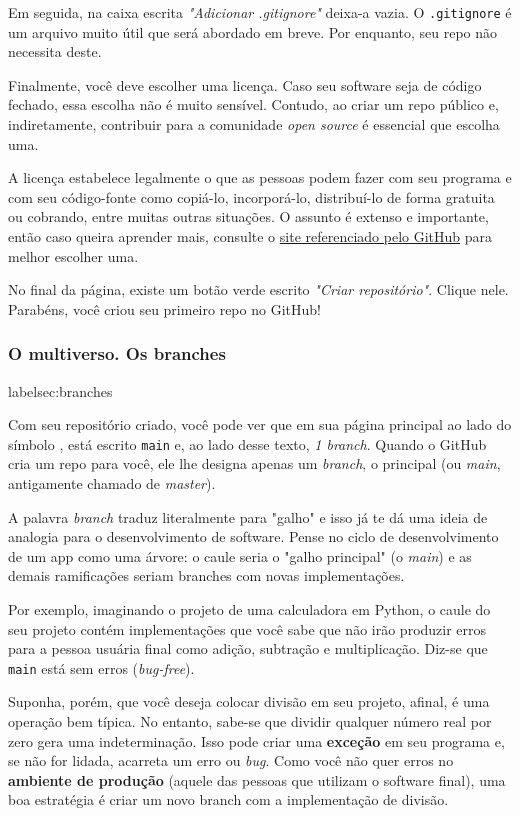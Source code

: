 \documentclass{article}
\begin{document}
	Em seguida, na caixa escrita \textit{"Adicionar .gitignore"} deixa-a vazia. O \texttt{.gitignore} é um arquivo muito útil 
	que será abordado em breve. Por enquanto, seu repo não necessita deste. 
	
	Finalmente, você deve escolher uma licença. Caso seu software seja de código fechado, essa escolha não é muito sensível.
	Contudo, ao criar um repo público e, indiretamente, contribuir para a comunidade \textit{open source} é essencial que escolha 
	uma.

	A licença estabelece legalmente o que as pessoas podem fazer com seu programa e com seu código-fonte como copiá-lo, incorporá-lo,
	distribuí-lo de forma gratuita ou cobrando, entre muitas outras situações. O assunto é extenso e importante, então caso queira 
	aprender mais, consulte o \href{https://choosealicense.com/}{site referenciado pelo GitHub} para melhor escolher uma.

	No final da página, existe um botão verde escrito \textit{"Criar repositório"}. Clique nele. Parabéns, você criou seu primeiro 
	repo no GitHub!

	\subsubsection{O multiverso. Os branches}
	label{sec:branches}

	Com seu repositório criado, você pode ver que em sua página principal ao lado do símbolo , está
	escrito \texttt{main} e, ao lado desse texto, \textit{1 branch}. Quando o GitHub cria um repo para você, ele lhe designa 
	apenas um \textit{branch}, o principal (ou \textit{main}, antigamente chamado de \textit{master}). 
	
	A palavra \textit{branch} traduz literalmente para "galho" e isso já te dá uma ideia de analogia para o desenvolvimento de 
	software. Pense no ciclo de desenvolvimento de um app como uma árvore: o caule seria o "galho principal" (o \textit{main})
	e as demais ramificações seriam branches com novas implementações.

	Por exemplo, imaginando o projeto de uma calculadora em Python, o caule do seu projeto contém implementações que você sabe 
	que não irão produzir erros para a pessoa usuária final como adição, subtração e multiplicação. Diz-se que \texttt{main} 
	está sem erros (\textit{bug-free}).
	
	Suponha, porém, que você deseja colocar divisão em seu projeto, afinal, é uma operação bem típica. No entanto, sabe-se que dividir
	qualquer número real por zero gera uma indeterminação. Isso pode criar uma \textbf{exceção} em seu programa e, se não for lidada, 
	acarreta um erro ou \textit{bug}. Como você não quer erros no \textbf{ambiente de produção} (aquele das pessoas que utilizam o software final),
	uma boa estratégia é criar um novo branch com a implementação de divisão. 
\end{document}
